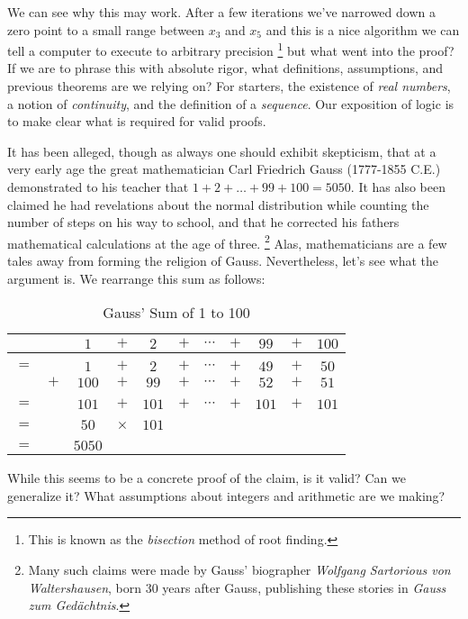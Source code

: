     We can see why this may work. After a few iterations we've narrowed down a
    zero point to a small range between $x_{3}$ and $x_{5}$ and this is a
    nice algorithm we can tell a computer to execute to arbitrary precision%
    \footnote{%
        This is known as the \textit{bisection} method%
         of root finding.%
    }
    but what went into the proof? If we are to phrase this with absolute rigor,
    what definitions, assumptions, and previous theorems are we relying on? For
    starters, the existence of \textit{real numbers}, a notion of
    \textit{continuity}, and the definition of a \textit{sequence}. Our
    exposition of logic is to make clear what is required for valid proofs.
    \begin{example}
        \label{ex:Logic_Gauss_Sum}%
        It has been alleged, though as always one should exhibit skepticism,
        that at a very early age the great mathematician Carl Friedrich
        Gauss (1777-1855 C.E.) demonstrated
        to his teacher that $1+2+\dots+99+100=5050$. It has also been claimed
        he had revelations about the normal distribution while counting the
        number of steps on his way to school, and that he corrected his fathers
        mathematical calculations at the age of three.%
        \footnote{%
            Many such claims were made by Gauss' biographer
            \textit{Wolfgang Sartorious von Waltershausen}, born 30 years after
            Gauss, publishing these stories in
            \textit{Gauss zum Ged\"{a}chtnis}.
        } Alas, mathematicians are
        a few tales away from forming the religion of Gauss. Nevertheless, let's
        see what the argument is. We rearrange this sum as follows:
        \begin{table}[H]
            \centering
            \captionsetup{type=table}
            \begin{tabular}{ccccccccccc}
                &&$1$&$+$&$2$&$+$&$\cdots$&$+$&$99$&$+$&$100$\\
                \hline\\
                $=$&&$1$&$+$&$2$&$+$&$\cdots$&$+$&$49$&$+$&$50$\\
                &$+$&$100$&$+$&$99$&$+$&$\cdots$&$+$&$52$&$+$&$51$\\
                \hline\\
                $=$&&$101$&$+$&$101$&$+$&$\cdots$&$+$&$101$&$+$&$101$\\
                \hline\\
                $=$&&$50$&$\times$&$101$\\
                \hline\\
                $=$&&$5050$
            \end{tabular}
            \caption{Gauss' Sum of 1 to 100}
        \end{table}
        While this seems to be a concrete proof of the claim, is it valid? Can
        we generalize it? What assumptions about integers and arithmetic are we
        making?
    \end{example}
